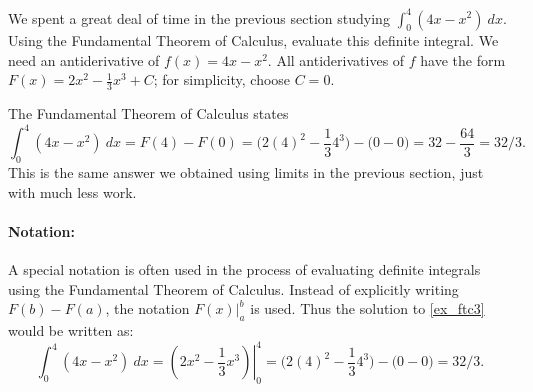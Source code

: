 
\begin{example}\label{ex_ftc3}
We spent a great deal of time in the previous section studying $\int_0^4(4x-x^2)\ dx$. Using the Fundamental Theorem of Calculus, evaluate this definite integral.
\solution
We need an antiderivative of $f(x)=4x-x^2$. All antiderivatives of $f$ have the form $F(x) = 2x^2-\frac13x^3+C$; for simplicity, choose $C=0$.

The Fundamental Theorem of Calculus states
\[
\int_0^4(4x-x^2)\ dx = F(4)-F(0)
= \bigl(2(4)^2-\frac134^3\bigr)-\bigl(0-0\bigr) = 32-\frac{64}3 = 32/3.
\]
This is the same answer we obtained using limits in the previous section, just with much less work.
\end{example}

\paragraph{Notation:}%
A special notation is often used in the process of evaluating definite integrals using the Fundamental Theorem of Calculus. Instead of explicitly writing $F(b)-F(a)$, the notation $F(x)\Big|_a^b$ is used. Thus the solution to \autoref{ex_ftc3} would be written as:
\[
\int_0^4(4x-x^2)\ dx = \left.\left(2x^2-\frac13x^3\right)\right|_0^4
= \bigl(2(4)^2-\frac134^3\bigr)-\bigl(0-0\bigr) =  32/3.
\]

